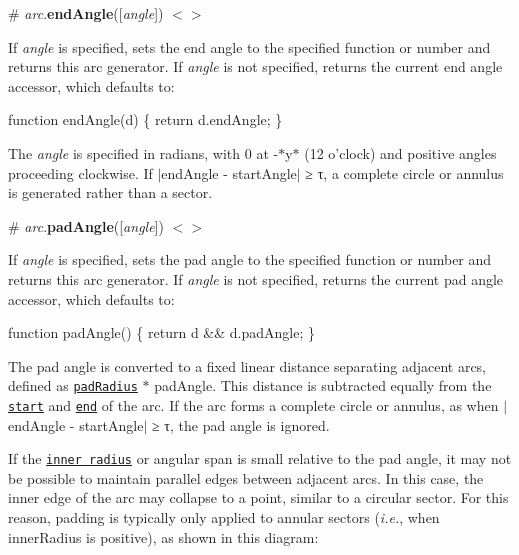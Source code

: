 \label{_arc_endAngle}%
\# {\itshape arc}.{\bfseries end\+Angle}(\mbox{[}{\itshape angle}\mbox{]}) \href{https://github.com/d3/d3-shape/blob/master/src/arc.js#L250}{\tt $<$$>$}

If {\itshape angle} is specified, sets the end angle to the specified function or number and returns this arc generator. If {\itshape angle} is not specified, returns the current end angle accessor, which defaults to\+:


\begin{DoxyCode}
function endAngle(d) \{
  return d.endAngle;
\}
\end{DoxyCode}


The {\itshape angle} is specified in radians, with 0 at -\/$\ast$y$\ast$ (12 o’clock) and positive angles proceeding clockwise. If $\vert$end\+Angle -\/ start\+Angle$\vert$ ≥ τ, a complete circle or annulus is generated rather than a sector.

\label{_arc_padAngle}%
\# {\itshape arc}.{\bfseries pad\+Angle}(\mbox{[}{\itshape angle}\mbox{]}) \href{https://github.com/d3/d3-shape/blob/master/src/arc.js#L254}{\tt $<$$>$}

If {\itshape angle} is specified, sets the pad angle to the specified function or number and returns this arc generator. If {\itshape angle} is not specified, returns the current pad angle accessor, which defaults to\+:


\begin{DoxyCode}
function padAngle() \{
  return d && d.padAngle;
\}
\end{DoxyCode}


The pad angle is converted to a fixed linear distance separating adjacent arcs, defined as \href{#arc_padRadius}{\tt pad\+Radius} $\ast$ pad\+Angle. This distance is subtracted equally from the \href{#arc_startAngle}{\tt start} and \href{#arc_endAngle}{\tt end} of the arc. If the arc forms a complete circle or annulus, as when $\vert$end\+Angle -\/ start\+Angle$\vert$ ≥ τ, the pad angle is ignored.

If the \href{#arc_innerRadius}{\tt inner radius} or angular span is small relative to the pad angle, it may not be possible to maintain parallel edges between adjacent arcs. In this case, the inner edge of the arc may collapse to a point, similar to a circular sector. For this reason, padding is typically only applied to annular sectors ({\itshape i.\+e.}, when inner\+Radius is positive), as shown in this diagram\+:

\href{http://bl.ocks.org/mbostock/f37b07b92633781a46f7}{\tt }\href{http://bl.ocks.org/mbostock/99f0a6533f7c949cf8b8}{\tt }

